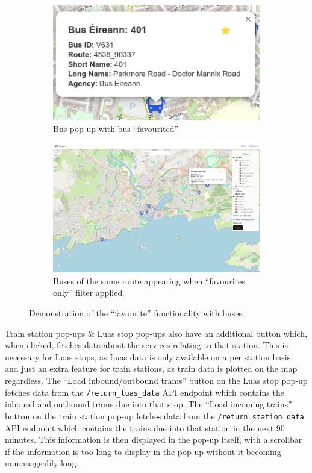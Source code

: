 \documentclass[a4paper,11pt]{report}
\begin{document}
\begin{figure}[H]
    \centering
    \begin{subfigure}[c]{0.35\textwidth}
        \centering
        \includegraphics[width=\textwidth]{./images/favouritedbus.png}
        \caption{Bus pop-up with bus ``favourited''}
    \end{subfigure}
    \hfill
    \begin{subfigure}[c]{0.6\textwidth}
        \centering
        \includegraphics[width=\textwidth]{./images/401busesfavourited.png}
        \caption{Buses of the same route appearing when ``favourites only'' filter applied}
    \end{subfigure}
    \caption{Demonstration of the ``favourite'' functionality with buses}
\end{figure}

Train station pop-ups \& Luas stop pop-ups also have an additional button which, when clicked, fetches data about the services relating to that station.
This is necessary for Luas stops, as Luas data is only available on a per station basis, and just an extra feature for train stations, as train data is plotted on the map regardless.
The ``Load inbound/outbound trams'' button on the Luas stop pop-up fetches data from the \verb|/return_luas_data| API endpoint which contains the inbound and outbound trams due into that stop.
The ``Load incoming trains'' button on the train station pop-up fetches data from the \verb|/return_station_data| API endpoint which contains the trains due into that station in the next 90 minutes.
This information is then displayed in the pop-up itself, with a scrollbar if the information is too long to display in the pop-up without it becoming unmanageably long.
\end{document}
